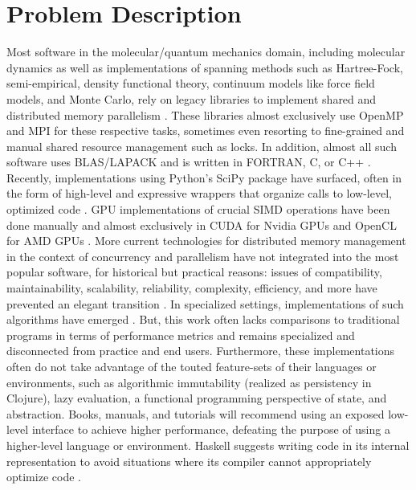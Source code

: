 \section{Problem Description}
Most software in the molecular/quantum mechanics domain, including molecular
dynamics as well as implementations of spanning methods such as Hartree-Fock,
semi-empirical, density functional theory, continuum models like force field
models, and Monte Carlo, rely on legacy libraries to implement shared and
distributed memory parallelism \cite{orca} \cite{lammps}
\cite{lammps_montecarlo}. These libraries almost exclusively use OpenMP and MPI
for these respective tasks, sometimes even resorting to fine-grained and manual
shared resource management such as locks. In addition, almost all such software
uses BLAS/LAPACK and is written in FORTRAN, C, or C++ \cite{lapack}
\cite{eigen}. Recently, implementations using Python's SciPy package have
surfaced, often in the form of high-level and expressive wrappers that organize
calls to low-level, optimized code
\cite{scipy}. GPU implementations of crucial SIMD operations have been done
manually and almost exclusively in CUDA for Nvidia GPUs and OpenCL for AMD GPUs
\cite{gpu}. More current technologies for distributed memory management in the
context of concurrency and parallelism have not integrated into the most popular
software, for historical but practical reasons: issues of compatibility,
maintainability, scalability, reliability, complexity, efficiency, and more have
prevented an elegant transition \cite{kokkos_port}. In specialized settings,
implementations of such algorithms have emerged \cite{erlang_hpc}
\cite{clojure_hpc}. But, this work often lacks comparisons to traditional
programs in terms of performance metrics and remains specialized and
disconnected from practice and end users. Furthermore, these implementations
often do not take advantage of the touted feature-sets of their languages or
environments, such as algorithmic immutability (realized as persistency in
Clojure), lazy evaluation, a functional programming perspective of state, and
abstraction. Books, manuals, and tutorials will recommend using an exposed
low-level interface to achieve higher performance, defeating the purpose of
using a higher-level language or environment. Haskell suggests writing code in
its internal representation to avoid situations where its compiler cannot
appropriately optimize code \cite{haskell_opt}.

